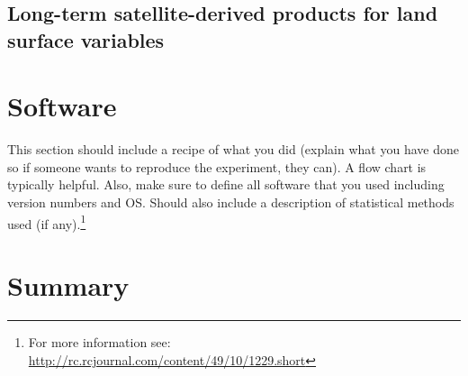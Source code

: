 \subsection{Long-term satellite-derived products for land surface variables}

\section{Software}

This section should include a recipe of what you did (explain what you have done so if someone wants to reproduce the experiment, they can).  A flow chart is typically helpful.  Also, make sure to define all software that you used including version numbers and OS.  Should also include a description of statistical methods used (if any).\footnote{For more information see: \url{http://rc.rcjournal.com/content/49/10/1229.short}}

\blindtext

\section*{Summary}
\blindtext